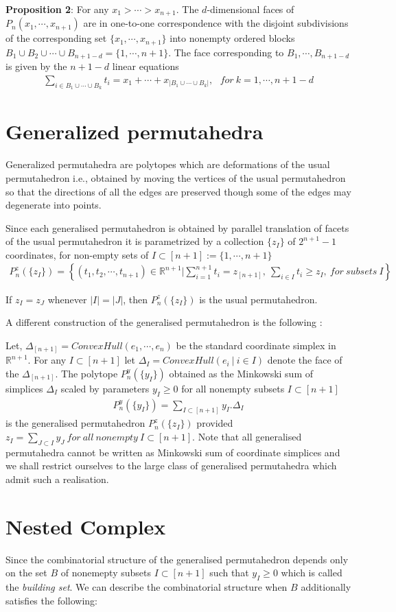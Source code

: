 \documentclass[hidelinks,12pt]{article}
\newcommand{\bea}[1]{\begin{eqnarray}\label{#1} }
\newcommand{\eea}{\end{eqnarray}}
\def\bea{\begin{eqnarray}}
\def\eea{\end{eqnarray}}
\begin{document}
{\bf Proposition 2}: For any  $x_1> \cdots > x_{n+1} $. The $d$-dimensional faces of $P_n ( x_1, \cdots, x_{n+1 })$ are in one-to-one correspondence with the disjoint subdivisions of the corresponding set $\{x_1,\cdots, x_{n+1 }\}$ into nonempty ordered blocks $B_1 \cup B_2 \cup \cdots \cup B_{n+1-d} =\{1,\cdots,n+1 \}$. The face corresponding to $B_1,\cdots, B_{n+1-d}$ is given by the $n+1-d$ linear equations 
\bea
\sum_{i \in B_1\cup \cdots \cup B_k} t_i = x_1 + \cdots +x_{| B_1 \cup \cdots \cup B_k |}, ~~~ for~ k=1,\cdots,n+1-d \nonumber
\eea 
\section*{Generalized permutahedra}
Generalized permutahedra are polytopes which are deformations of the usual permutahedron i.e., obtained by moving the vertices of the usual permutahedron so that the directions of all the edges are preserved though some of the edges may degenerate into points.

 Since each generalised permutahedron is obtained by parallel translation of facets of the usual permutahedron it is parametrized  by a collection $\{ z_I\}$ of $2^{n+1}-1$ coordinates, for non-empty sets of $I \subset [n+1] := \{1,\cdots,n+1 \}$
 \bea
 P_n^z(\{ z_I \}) = \left \{ (t_1, t_2, \cdots , t_{n+1}) \in \mathbb{R}^{n+1} | \sum_{i=1}^{n+1} t_i = z_{[n+1]},~ \sum_{i \in I} t_i \geq z_I, ~for ~subsets~ I  \right  \} \nonumber
 \eea
 
 If $z_I =z_J$ whenever $|I| =|J|$, then  $ P_n^z(\{ z_I \})$ is the usual permutahedron.
 
 
 A different construction of the generalised permutahedron is the following :
 
 Let, $\Delta_{[n+1]} = ConvexHull(e_1,\cdots,e_n)$ be the standard coordinate simplex in $\mathbb{R}^{n+1}$. For any $I \subset [n+1] $ let $\Delta_I =ConvexHull(e_i~|~i\in I)$ denote the face of the $\Delta_{[n+1]}$. The polytope $P_n^y(\{y_I \})$ obtained as the Minkowski sum of simplices $\Delta_I$ scaled by  parameters $y_I \geq 0$ for all nonempty subsets $I \subset [n+1]$
 \bea
 P_n^y(\{y_I \})= \sum_{I \subset[n+1]} y_I . \Delta_I  \nonumber
 \eea
is the generalised permutahedron $P_n^z(\{z_I \})$  provided $z_I = \sum_{J \subset I} y_J  ~ for ~all~nonempty ~I \subset [n+1]$.
Note that all generalised permutahedra cannot be written as Minkowski sum of coordinate simplices and we shall restrict ourselves to the large class of generalised permutahedra which admit such a realisation.
\section*{Nested Complex}
Since the combinatorial structure of the generalised permutahedron depends only on the set $B$ of nonemepty subsets $I \subset [n+1]$ such that $y_I \geq 0$ which is called the {\it building set}. We can describe the combinatorial structure when $B$ additionally satisfies the following:
\end{document}
